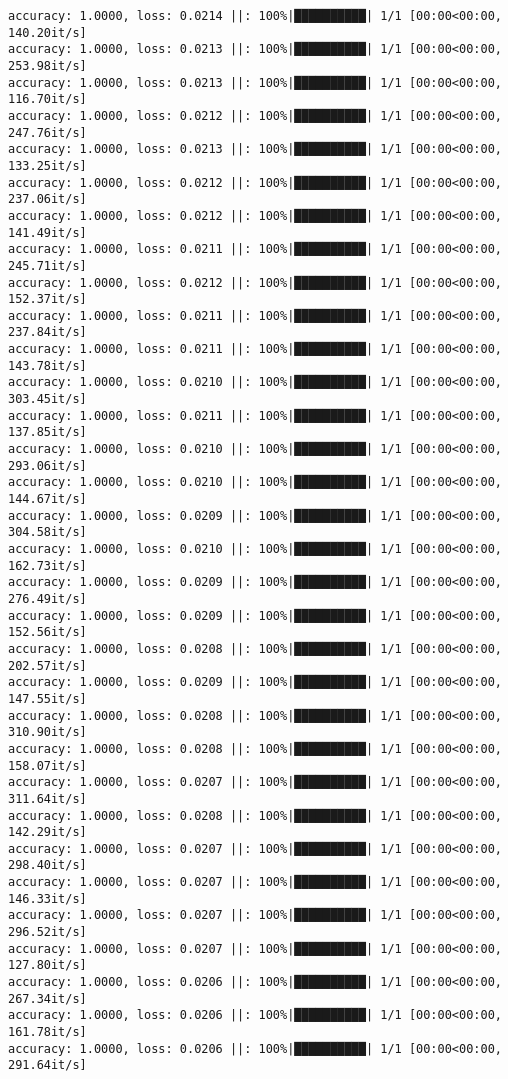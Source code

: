 \documentclass[
]{article}
\begin{document}
\begin{verbatim}
accuracy: 1.0000, loss: 0.0214 ||: 100%|██████████| 1/1 [00:00<00:00, 140.20it/s]
accuracy: 1.0000, loss: 0.0213 ||: 100%|██████████| 1/1 [00:00<00:00, 253.98it/s]
accuracy: 1.0000, loss: 0.0213 ||: 100%|██████████| 1/1 [00:00<00:00, 116.70it/s]
accuracy: 1.0000, loss: 0.0212 ||: 100%|██████████| 1/1 [00:00<00:00, 247.76it/s]
accuracy: 1.0000, loss: 0.0213 ||: 100%|██████████| 1/1 [00:00<00:00, 133.25it/s]
accuracy: 1.0000, loss: 0.0212 ||: 100%|██████████| 1/1 [00:00<00:00, 237.06it/s]
accuracy: 1.0000, loss: 0.0212 ||: 100%|██████████| 1/1 [00:00<00:00, 141.49it/s]
accuracy: 1.0000, loss: 0.0211 ||: 100%|██████████| 1/1 [00:00<00:00, 245.71it/s]
accuracy: 1.0000, loss: 0.0212 ||: 100%|██████████| 1/1 [00:00<00:00, 152.37it/s]
accuracy: 1.0000, loss: 0.0211 ||: 100%|██████████| 1/1 [00:00<00:00, 237.84it/s]
accuracy: 1.0000, loss: 0.0211 ||: 100%|██████████| 1/1 [00:00<00:00, 143.78it/s]
accuracy: 1.0000, loss: 0.0210 ||: 100%|██████████| 1/1 [00:00<00:00, 303.45it/s]
accuracy: 1.0000, loss: 0.0211 ||: 100%|██████████| 1/1 [00:00<00:00, 137.85it/s]
accuracy: 1.0000, loss: 0.0210 ||: 100%|██████████| 1/1 [00:00<00:00, 293.06it/s]
accuracy: 1.0000, loss: 0.0210 ||: 100%|██████████| 1/1 [00:00<00:00, 144.67it/s]
accuracy: 1.0000, loss: 0.0209 ||: 100%|██████████| 1/1 [00:00<00:00, 304.58it/s]
accuracy: 1.0000, loss: 0.0210 ||: 100%|██████████| 1/1 [00:00<00:00, 162.73it/s]
accuracy: 1.0000, loss: 0.0209 ||: 100%|██████████| 1/1 [00:00<00:00, 276.49it/s]
accuracy: 1.0000, loss: 0.0209 ||: 100%|██████████| 1/1 [00:00<00:00, 152.56it/s]
accuracy: 1.0000, loss: 0.0208 ||: 100%|██████████| 1/1 [00:00<00:00, 202.57it/s]
accuracy: 1.0000, loss: 0.0209 ||: 100%|██████████| 1/1 [00:00<00:00, 147.55it/s]
accuracy: 1.0000, loss: 0.0208 ||: 100%|██████████| 1/1 [00:00<00:00, 310.90it/s]
accuracy: 1.0000, loss: 0.0208 ||: 100%|██████████| 1/1 [00:00<00:00, 158.07it/s]
accuracy: 1.0000, loss: 0.0207 ||: 100%|██████████| 1/1 [00:00<00:00, 311.64it/s]
accuracy: 1.0000, loss: 0.0208 ||: 100%|██████████| 1/1 [00:00<00:00, 142.29it/s]
accuracy: 1.0000, loss: 0.0207 ||: 100%|██████████| 1/1 [00:00<00:00, 298.40it/s]
accuracy: 1.0000, loss: 0.0207 ||: 100%|██████████| 1/1 [00:00<00:00, 146.33it/s]
accuracy: 1.0000, loss: 0.0207 ||: 100%|██████████| 1/1 [00:00<00:00, 296.52it/s]
accuracy: 1.0000, loss: 0.0207 ||: 100%|██████████| 1/1 [00:00<00:00, 127.80it/s]
accuracy: 1.0000, loss: 0.0206 ||: 100%|██████████| 1/1 [00:00<00:00, 267.34it/s]
accuracy: 1.0000, loss: 0.0206 ||: 100%|██████████| 1/1 [00:00<00:00, 161.78it/s]
accuracy: 1.0000, loss: 0.0206 ||: 100%|██████████| 1/1 [00:00<00:00, 291.64it/s]

\end{verbatim}
\end{document}
